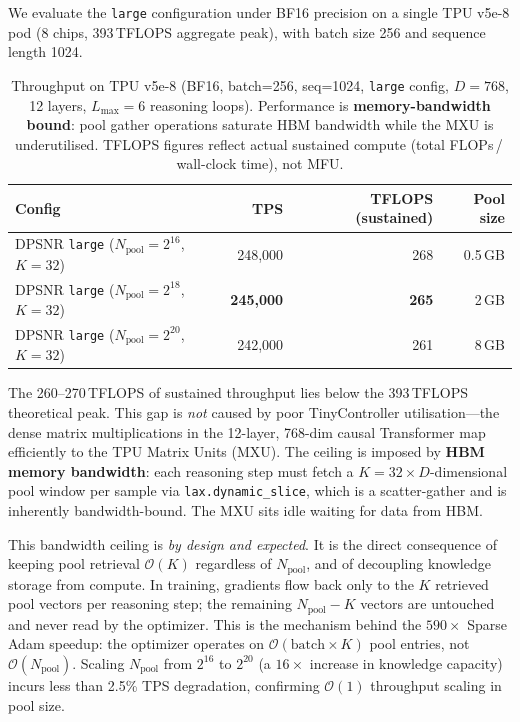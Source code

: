 \documentclass[11pt]{article}
\begin{document}
We evaluate the \texttt{large} configuration under BF16 precision on a single
TPU v5e-8 pod (8 chips, 393\,TFLOPS aggregate peak), with batch size 256 and
sequence length 1024.

\begin{table}[ht]
\centering
\caption{
  Throughput on TPU v5e-8 (BF16, batch=256, seq=1024, \texttt{large} config,
  $D=768$, 12 layers, $L_{\max}=6$ reasoning loops).
  Performance is \textbf{memory-bandwidth bound}: pool gather operations saturate
  HBM bandwidth while the MXU is underutilised. TFLOPS figures reflect actual
  sustained compute (total FLOPs\,/\,wall-clock time), not MFU.
}
\label{tab:tpu}
\setlength{\tabcolsep}{6pt}
\begin{tabular}{lrrr}
\toprule
Config & TPS & TFLOPS (sustained) & Pool size \\
\midrule
DPSNR \texttt{large} ($N_{\text{pool}}=2^{16}$, $K=32$) & 248{,}000 & 268 & 0.5\,GB \\
DPSNR \texttt{large} ($N_{\text{pool}}=2^{18}$, $K=32$) & \textbf{245{,}000} & \textbf{265} & 2\,GB \\
DPSNR \texttt{large} ($N_{\text{pool}}=2^{20}$, $K=32$) & 242{,}000 & 261 & 8\,GB \\
\bottomrule
\end{tabular}
\end{table}

\noindent
The 260--270\,TFLOPS of sustained throughput lies below the 393\,TFLOPS
theoretical peak. This gap is \emph{not} caused by poor TinyController
utilisation---the dense matrix multiplications in the 12-layer, 768-dim causal
Transformer map efficiently to the TPU Matrix Units (MXU). The ceiling is
imposed by \textbf{HBM memory bandwidth}: each reasoning step must fetch a
$K{=}32 \times D$-dimensional pool window per sample via
\texttt{lax.dynamic\_slice}, which is a scatter-gather and is inherently
bandwidth-bound. The MXU sits idle waiting for data from HBM.

This bandwidth ceiling is \emph{by design and expected}. It is the direct
consequence of keeping pool retrieval $\mathcal{O}(K)$ regardless of
$N_{\text{pool}}$, and of decoupling knowledge storage from compute. In training,
gradients flow back only to the $K$ retrieved pool vectors per reasoning step;
the remaining $N_{\text{pool}} - K$ vectors are untouched and never read by the
optimizer. This is the mechanism behind the $590\times$ Sparse Adam speedup:
the optimizer operates on $\mathcal{O}(\text{batch} \times K)$ pool entries, not
$\mathcal{O}(N_{\text{pool}})$. Scaling $N_{\text{pool}}$ from $2^{16}$ to
$2^{20}$ (a $16{\times}$ increase in knowledge capacity) incurs less than 2.5\%
TPS degradation, confirming $\mathcal{O}(1)$ throughput scaling in pool size.
\end{document}

